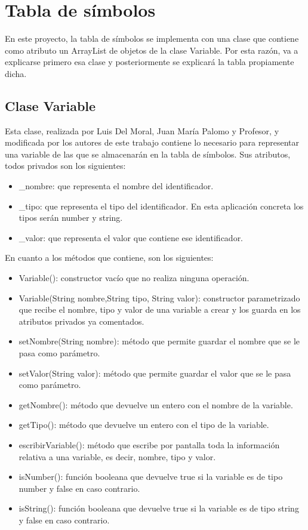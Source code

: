 \documentclass[a4paper,12pt,twoside,openright]{report}
\begin{document}
  \section{Tabla de símbolos}
  En este proyecto, la tabla de símbolos se implementa con una clase que contiene como atributo un ArrayList de objetos 
  de la clase Variable. Por esta razón, va a explicarse primero esa clase y posteriormente se explicará la tabla propiamente 
  dicha.
  
  \subsection{Clase Variable}
  Esta clase, realizada por Luis Del Moral, Juan María Palomo y Profesor, y modificada por los autores de este trabajo 
  contiene lo necesario para representar una   variable de las que se almacenarán en la tabla de símbolos. 
  Sus atributos, todos privados son los siguientes:
  \begin{itemize}
   \item \_nombre: que representa el nombre del identificador.
   \item \_tipo: que representa el tipo del identificador. En esta aplicación concreta los tipos serán number y string.
   \item \_valor: que representa el valor que contiene ese identificador.
  \end{itemize}
  En cuanto a los métodos que contiene, son los siguientes:
  \begin{itemize}
   \item Variable(): constructor vacío que no realiza ninguna operación.
   \item Variable(String nombre,String tipo, String valor): constructor parametrizado que recibe el nombre, tipo y 
   valor de una variable a crear y los guarda en los atributos privados ya comentados.
   \item setNombre(String nombre): método que permite guardar el nombre que se le pasa como parámetro.
   \item setValor(String valor): método que permite guardar el valor que se le pasa como parámetro.
   \item getNombre(): método que devuelve un entero con el nombre de la variable.
   \item getTipo(): método que devuelve un entero con el tipo de la variable.
   \item escribirVariable(): método que escribe por pantalla toda la información relativa a una variable, es decir, nombre, 
   tipo y valor.
   \item isNumber(): función booleana que devuelve true si la variable es de tipo number y false en caso contrario.
   \item isString(): función booleana que devuelve true si la variable es de tipo string y false en caso contrario.
  \end{itemize}
\end{document}

